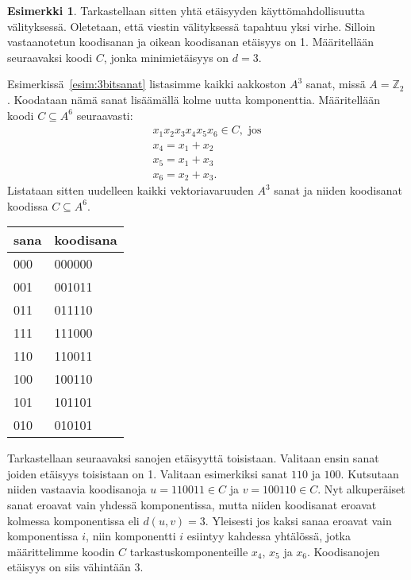 \documentclass[a4paper,12pt,leqno,oneside]{report} %
\theoremstyle{plain}
\theoremstyle{definition}
\newtheorem{esimerkki}{Esimerkki}[chapter]
\theoremstyle{remark}
\numberwithin{equation}{chapter}
\newcommand*{\Zset}{\mathbb{Z}}  %
\begin{document}
    \begin{esimerkki}
        Tarkastellaan sitten yhtä etäisyyden käyttömahdollisuutta välityksessä. Oletetaan, että viestin välityksessä tapahtuu yksi virhe. Silloin vastaanotetun koodisanan ja oikean koodisanan etäisyys on 1. Määritellään seuraavaksi koodi $C$, jonka minimietäisyys on $d = 3$.
        
        Esimerkissä~\ref{esim:3bitsanat} listasimme kaikki aakkoston $A^3$ sanat, missä $A = \Zset_2$. Koodataan nämä sanat lisäämällä kolme uutta komponenttia. Määritellään koodi $C \subseteq A^6$ seuraavasti:
        \begin{gather*}
            x_1x_2x_3x_4x_5x_6 \in C, \text{ jos} \\
            x_4 = x_1 + x_2 \\
            x_5 = x_1 + x_3 \\
            x_6 = x_2 + x_3.
        \end{gather*}
        Listataan sitten uudelleen kaikki vektoriavaruuden $A^3$ sanat ja niiden koodisanat koodissa $C \subseteq A^6$.
        \begin{center}
            \begin{tabular}[t]{ll}
                sana & koodisana \\ \midrule
                000 & 000000\\
                001 & 001011\\
                011 & 011110\\
                111 & 111000\\
                110 & 110011\\
                100 & 100110\\
                101 & 101101\\
                010 & 010101\\
            \end{tabular}
        \end{center}
        Tarkastellaan seuraavaksi sanojen etäisyyttä toisistaan. Valitaan ensin sanat joiden etäisyys toisistaan on 1. Valitaan esimerkiksi sanat $110$ ja $100$. Kutsutaan niiden vastaavia koodisanoja $u = 110011 \in C$ ja $v = 100110 \in C$. Nyt alkuperäiset sanat eroavat vain yhdessä komponentissa, mutta niiden koodisanat eroavat kolmessa komponentissa eli $d(u,v) = 3$. Yleisesti jos kaksi sanaa eroavat vain komponentissa $i$, niin komponentti $i$ esiintyy kahdessa yhtälössä, jotka määrittelimme koodin $C$ tarkastuskomponenteille 
        $x_4$, $x_5$ ja $x_6$. Koodisanojen etäisyys on siis vähintään 3.


\end{esimerkki}
\end{document}
